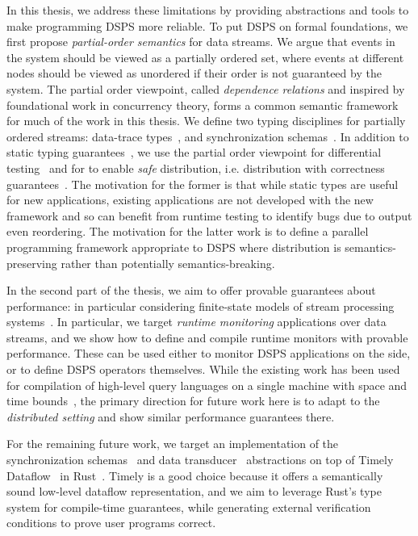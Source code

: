 In this thesis, we address these limitations by providing abstractions and tools to make programming DSPS more reliable.
To put DSPS on formal foundations, we first propose \emph{partial-order semantics} for data streams.
We argue that events in the system should be viewed as a partially ordered set,
where events at different nodes should be viewed as unordered if their order
is not guaranteed by the system.
The partial order viewpoint, called \emph{dependence relations} and inspired by foundational work in concurrency theory,
forms a common semantic framework for much of the work in this thesis.
We define two typing disciplines for partially ordered streams:
data-trace types~,
and synchronization schemas~.
In addition to static typing guarantees~,
we use the partial order viewpoint for differential testing~
and for to enable \emph{safe} distribution, i.e. distribution with correctness guarantees~.
The motivation for the former is that while static types are useful
for new applications, existing applications are not developed with the new
framework and so can benefit from runtime testing to identify bugs due to
output even reordering.
The motivation for the latter work is to define a parallel programming framework appropriate to DSPS where distribution is semantics-preserving
rather than potentially semantics-breaking.

In the second part of the thesis, we aim to offer provable guarantees about performance: in particular considering finite-state models of stream processing systems~.
In particular, we target \emph{runtime monitoring} applications
over data streams, and we show how to define and compile runtime monitors
with provable performance.
These can be used either to monitor DSPS applications on the side,
or to define DSPS operators themselves.
While the existing work has been used for compilation of high-level query languages on a single machine with space and time bounds~\cite{popl19,QRE,StreamQRE},
the primary direction for future work here is to adapt to the \emph{distributed setting} and show similar performance guarantees there.

For the remaining future work, we target an implementation of the synchronization schemas~ and data transducer~ abstractions on top of Timely Dataflow~\cite{Timely,Naiad2013} in Rust~\cite{RustLang}.
Timely is a good choice because it offers a semantically sound low-level dataflow representation,
and we aim to leverage Rust's type system for compile-time guarantees,
while generating external verification conditions to prove user programs correct.

